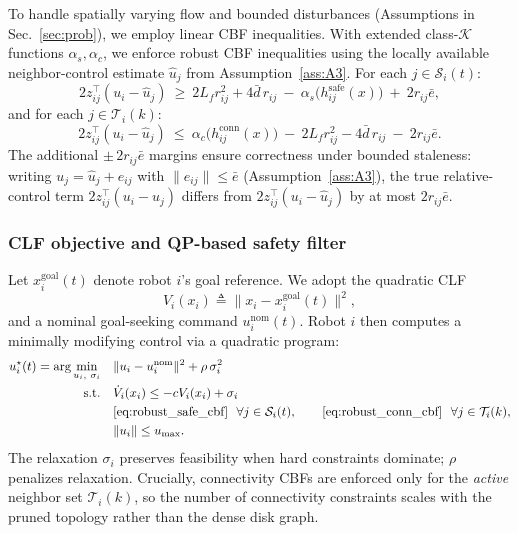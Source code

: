 \documentclass[conference]{IEEEconf}
\theoremstyle{plain}
\begin{document}
To handle spatially varying flow and bounded disturbances (Assumptions in Sec.~\ref{sec:prob}), we employ linear CBF inequalities.
With extended class-$\mathcal{K}$ functions $\alpha_s,\alpha_c$, we enforce robust CBF inequalities using the locally available neighbor-control estimate $\hat u_j$ from Assumption~\ref{ass:A3}.
For each $j\in\mathcal{S}_i(t)$:
\begin{equation}
2 z_{ij}^\top (u_i-\hat u_j)\ \ge\ 2L_f r_{ij}^2 + 4\bar d\, r_{ij}\ -\ \alpha_s\!\big(h^{\mathrm{safe}}_{ij}(x)\big)\ +\ 2 r_{ij}\bar e,
\label{eq:robust_safe_cbf}
\end{equation}
and for each $j\in\mathcal{T}_i(k)$:
\begin{equation}
2 z_{ij}^\top (u_i-\hat u_j)\ \le\ \alpha_c\!\big(h^{\mathrm{conn}}_{ij}(x)\big)\ -\ 2L_f r_{ij}^2 - 4\bar d\, r_{ij}\ -\ 2 r_{ij}\bar e.
\label{eq:robust_conn_cbf}
\end{equation}
The additional $\pm\,2r_{ij}\bar e$ margins ensure correctness under bounded staleness: writing $u_j=\hat u_j+e_{ij}$ with $\|e_{ij}\|\le \bar e$ (Assumption~\ref{ass:A3}), the true relative-control term $2z_{ij}^\top(u_i-u_j)$ differs from $2z_{ij}^\top(u_i-\hat u_j)$ by at most $2r_{ij}\bar e$.

\subsubsection{CLF objective and QP-based safety filter}
Let $x_i^{\mathrm{goal}}(t)$ denote robot $i$'s goal reference.
We adopt the quadratic CLF
\begin{equation}
V_i(x_i) \triangleq \|x_i-x_i^{\mathrm{goal}}(t)\|^2,
\label{eq:clf_V}
\end{equation}
and a nominal goal-seeking command $u_i^{\mathrm{nom}}(t)$.
Robot $i$ then computes a minimally modifying control via a quadratic program:
\begin{align}
u_i^\star(t) = \arg\min_{u_i,\ \sigma_i}\quad &
\|u_i-u_i^{\mathrm{nom}}\|^2 + \rho\,\sigma_i^2
\label{eq:clf_cbf_qp_obj}\\
\text{s.t.}\quad
& \dot V_i(x_i) \le -c V_i(x_i) + \sigma_i
\label{eq:clf_constraint}\\
& \eqref{eq:robust_safe_cbf}\ \ \forall j\in\mathcal{S}_i(t),\qquad
\eqref{eq:robust_conn_cbf}\ \ \forall j\in\mathcal{T}_i(k),
\label{eq:cbf_constraints}\\
& \|u_i\|\le u_{\max}.
\label{eq:input_bound}
\end{align}
The relaxation $\sigma_i$ preserves feasibility when hard constraints dominate; $\rho$ penalizes relaxation.
Crucially, connectivity CBFs are enforced only for the \emph{active} neighbor set $\mathcal{T}_i(k)$, so the number of connectivity constraints scales with the pruned topology rather than the dense disk graph.
\end{document}
